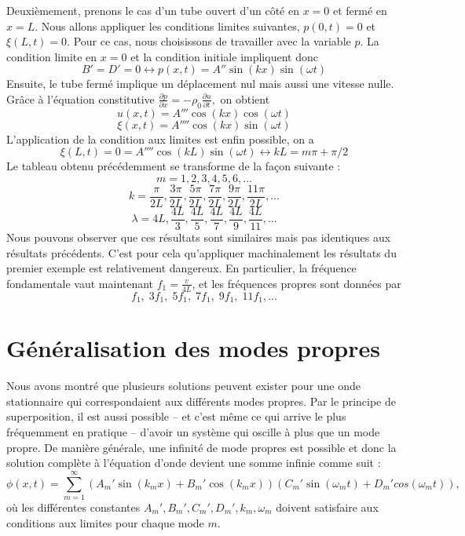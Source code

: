 Deuxièmement, prenons le cas d'un tube ouvert d'un côté en $x=0$ et fermé en $x=L$. Nous allons appliquer les conditions limites suivantes, $p(0,t)=0$ et $\xi(L,t)=0$. Pour ce cas, nous choisissons de travailler avec la variable $p$. La condition limite en $x=0$ et la condition initiale impliquent donc
$$B' = D' = 0 \leftrightarrow p(x,t)=A''\sin(kx)\sin(\omega t)$$
Ensuite, le tube fermé implique un déplacement nul mais aussi une vitesse nulle. Grâce à l'équation constitutive $\frac{\partial p}{\partial x}=-\rho_0\frac{\partial u}{\partial t},$
on obtient
$$u(x,t)=A'''\cos(kx)\cos(\omega t)$$
$$\xi(x,t)=A''''\cos(kx)\sin(\omega t)$$
L'application de la condition aux limites est enfin possible, on a 
$$\xi(L,t)=0=A''''\cos(kL)\sin(\omega t) \leftrightarrow kL=m\pi + \pi/2$$
Le tableau obtenu précédemment se transforme de la façon suivante : 
$$ m = 1,2,3,4,5,6,...$$
$$ k = \frac{\pi}{2L},\frac{3\pi}{2L},\frac{5\pi}{2L},\frac{7\pi}{2L},\frac{9\pi}{2L},\frac{11\pi}{2L},...$$
$$ \lambda = 4L,\frac{4L}{3},\frac{4L}{5},\frac{4L}{7},\frac{4L}{9},\frac{4L}{11},... $$
Nous pouvons observer que ces résultats sont similaires mais pas identiques aux résultats précédents. C'est pour cela qu'appliquer machinalement les résultats du premier exemple est relativement dangereux. En particulier, la fréquence fondamentale vaut maintenant $f_1=\frac{v}{4L}$, et les fréquences propres sont données par
$$ f_1,\; 3f_1,\; 5f_1,\; 7f_1,\; 9f_1,\; 11f_1, \ldots$$

\section{Généralisation des modes propres}
Nous avons montré que plusieurs solutions peuvent exister pour une onde stationnaire qui correspondaient aux différents modes propres. Par le principe de superposition, il est aussi possible -- et c'est même ce qui arrive le plus fréquemment en pratique -- d'avoir un système qui oscille à plus que un mode propre. De manière générale, une infinité de mode propres est possible et donc la solution complète à l'équation d'onde devient une somme infinie comme suit : 
\[ \phi(x,t) = \sum_{m=1}^\infty(A_m'\sin(k_mx) + B_m' \cos(k_mx))(C_m'\sin(\omega_mt) + D_m' cos(\omega_mt)), \]
où les différentes constantes $A_m',B_m',C_m',D_m', k_m,\omega_m$ doivent satisfaire aux conditions aux limites pour chaque mode $m$.


